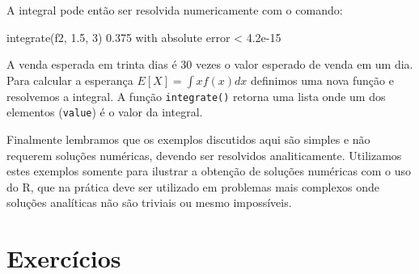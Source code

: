 \documentclass[
  10pt,
  a4paper]{book}
\newenvironment{Shaded}{\begin{snugshade}}{\end{snugshade}}
\newcommand{\ControlFlowTok}[1]{\textcolor[rgb]{0.13,0.29,0.53}{\textbf{#1}}}
\newcommand{\DecValTok}[1]{\textcolor[rgb]{0.00,0.00,0.81}{#1}}
\newcommand{\FloatTok}[1]{\textcolor[rgb]{0.00,0.00,0.81}{#1}}
\newcommand{\FunctionTok}[1]{\textcolor[rgb]{0.00,0.00,0.00}{#1}}
\newcommand{\NormalTok}[1]{#1}
\newcommand{\OtherTok}[1]{\textcolor[rgb]{0.56,0.35,0.01}{#1}}
\newcommand{\SpecialCharTok}[1]{\textcolor[rgb]{0.00,0.00,0.00}{#1}}
\begin{document}
A integral pode então ser resolvida numericamente com o comando:

\begin{Shaded}
\begin{Highlighting}[]
\FunctionTok{integrate}\NormalTok{(f2, }\FloatTok{1.5}\NormalTok{, }\DecValTok{3}\NormalTok{)}
\FloatTok{0.375}\NormalTok{ with absolute error }\SpecialCharTok{\textless{}} \FloatTok{4.2e{-}15}
\end{Highlighting}
\end{Shaded}

A venda esperada em trinta dias é 30 vezes o valor esperado de venda em
um dia. Para calcular a esperança \(E[X] = \int x f(x) dx\) definimos uma
nova função e resolvemos a integral. A função \texttt{integrate()} retorna uma
lista onde um dos elementos (\texttt{value}) é o valor da integral.

\begin{Shaded}
\end{Shaded}

Finalmente lembramos que os exemplos discutidos aqui são simples e não
requerem soluções numéricas, devendo ser resolvidos analiticamente.
Utilizamos estes exemplos somente para ilustrar a obtenção de soluções
numéricas com o uso do R, que na prática deve ser utilizado em
problemas mais complexos onde soluções analíticas não são triviais ou
mesmo impossíveis.

\hypertarget{exercuxedcios-16}{%
\section*{Exercícios}\label{exercuxedcios-16}}
\end{document}
